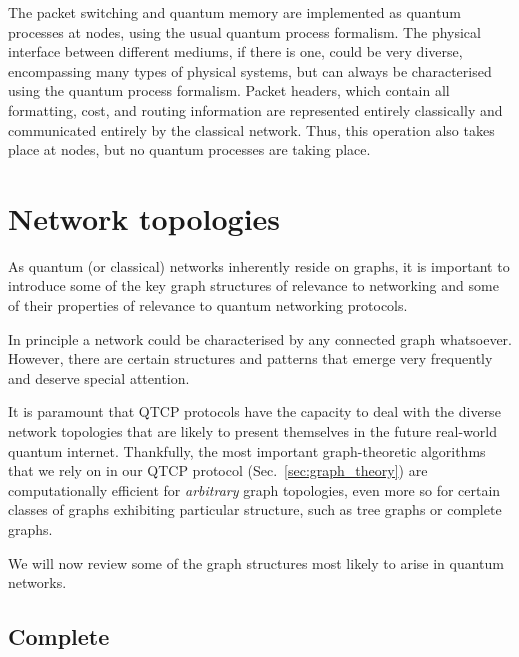 \documentclass[aps,rmp,twocolumn,amsmath,amssymb,nofootinbib,superscriptaddress]{revtex4}
\begin{document}
The packet switching and quantum memory are implemented as quantum processes at nodes, using the usual quantum process formalism. The physical interface between different mediums, if there is one, could be very diverse, encompassing many types of physical systems, but can always be characterised using the quantum process formalism. Packet headers, which contain all formatting, cost, and routing information are represented entirely classically and communicated entirely by the classical network. Thus, this operation also takes place at nodes, but no quantum processes are taking place.

%
%

\section{Network topologies}

As quantum (or classical) networks inherently reside on graphs, it is important to introduce some of the key graph structures of relevance to networking and some of their properties of relevance to quantum networking protocols.

In principle a network could be characterised by any connected graph whatsoever. However, there are certain structures and patterns that emerge very frequently and deserve special attention.

It is paramount that QTCP protocols have the capacity to deal with the diverse network topologies that are likely to present themselves in the future real-world quantum internet. Thankfully, the most important graph-theoretic algorithms that we rely on in our QTCP protocol (Sec.~\ref{sec:graph_theory}) are computationally efficient for \emph{arbitrary} graph topologies, even more so for certain classes of graphs exhibiting particular structure, such as tree graphs or complete graphs.

We will now review some of the graph structures most likely to arise in quantum networks.

%
%

\subsection{Complete}
\end{document}
